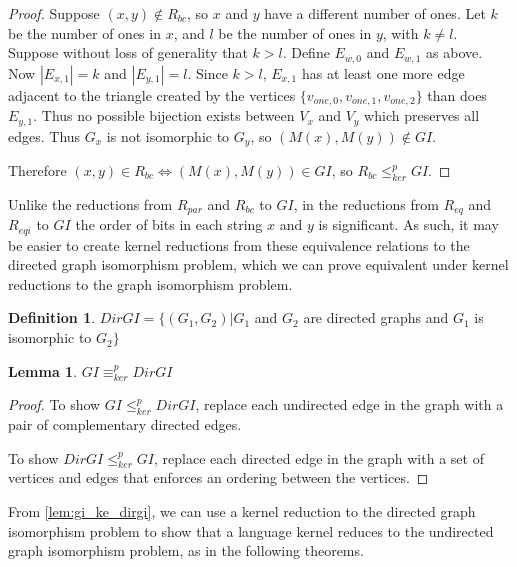 \documentclass[draft]{article}
\newtheorem{lemma}{Lemma}%
\theoremstyle{definition}
\newtheorem{definition}{Definition}%
\newcommand{\kr}{\leq^{p}_{ker}} %
\newcommand{\kequiv}{\equiv^{p}_{ker}} %
\begin{document}
\begin{proof}
  Suppose $(x, y)\notin R_{bc}$, so $x$ and $y$ have a different number of
  ones. Let $k$ be the number of ones in $x$, and $l$ be the number of ones in
  $y$, with $k\neq l$. Suppose without loss of generality that $k>l$. Define
  $E_{w,0}$ and $E_{w,1}$ as above. Now $|E_{x,1}|=k$ and $|E_{y,1}|=l$. Since
  $k>l$, $E_{x,1}$ has at least one more edge adjacent to the triangle created
  by the vertices $\{v_{one,0},v_{one,1},v_{one,2}\}$ than does $E_{y,1}$. Thus
  no possible bijection exists between $V_x$ and $V_y$ which preserves all
  edges. Thus $G_x$ is not isomorphic to $G_y$, so $(M(x), M(y))\notin GI$.

  Therefore $(x, y)\in R_{bc} \iff (M(x), M(y))\in GI$, so $R_{bc}\kr GI$.
\end{proof}

Unlike the reductions from $R_{par}$ and $R_{bc}$ to $GI$, in the reductions
from $R_{eq}$ and $R_{eqi}$ to $GI$ the order of bits in each string $x$ and
$y$ is significant. As such, it may be easier to create kernel reductions from
these equivalence relations to the directed graph isomorphism problem, which we
can prove equivalent under kernel reductions to the graph isomorphism problem.

\begin{definition}
  $DirGI=\{(G_1, G_2)|G_1$ and $G_2$ are directed graphs and $G_1$ is
  isomorphic to $G_2\}$
\end{definition}

\begin{lemma}\label{lem:gi_ke_dirgi}$GI\kequiv DirGI$\end{lemma}
\begin{proof}
  To show $GI\kr DirGI$, replace each undirected edge in the graph with a pair
  of complementary directed edges.
  
  To show $DirGI\kr GI$, replace each directed edge in the graph with a set of
  vertices and edges that enforces an ordering between the vertices.
\end{proof}

From \autoref{lem:gi_ke_dirgi}, we can use a kernel reduction to the directed
graph isomorphism problem to show that a language kernel reduces to the
undirected graph isomorphism problem, as in the following theorems.
\end{document}

